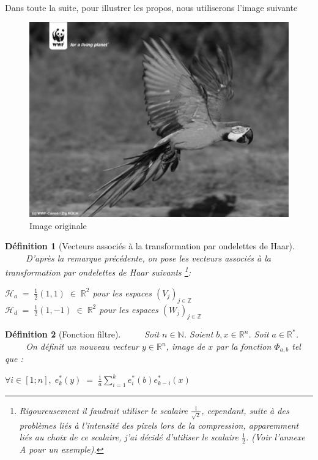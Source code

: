 \documentclass[a4paper,10pt]{report}
\theoremstyle{break}
\newtheorem{Def}{D\'{e}finition}
\begin{document}
    \paragraph{} Dans toute la suite, pour illustrer les propos, nous utiliserons l'image suivante
	\begin{figure}[!h]
	    \centering
	    
	    \includegraphics[width = 0.4 \linewidth]{ara_orig.eps}
	    
	    \caption{Image originale}
	\end{figure}
 
\newpage
	
    \begin{Def}[Vecteurs associ\'{e}s \`{a} la transformation par ondelettes de Haar]
      $\phantom{Prop}$ D'apr\`{e}s la remarque pr\'{e}c\'{e}dente, on pose les vecteurs associ\'{e}s \`{a} la transformation par ondelettes de Haar suivants
      \footnote{Rigoureusement il faudrait utiliser le scalaire $ \frac{1}{\sqrt{2}}$, cependant, suite \`{a} des probl\`{e}mes li\'{e}s
	\`{a} l'intensit\'{e} des pixels lors de la compression, apparemment li\'{e}s au choix de ce scalaire, j'ai d\'{e}cid\'{e}
	d'utiliser le scalaire $\frac{1}{2}$. (Voir l'annexe A pour un exemple).}:
      \begin{center}
	$ \mathcal{H}_a \; = \; \frac{1}{2} (1, 1) \; \in \; \mathbb{R}^2 $ pour les espaces $(V_j)_{j \in \mathbb{Z}}$ \\
	$ \mathcal{H}_d \; = \; \frac{1}{2} (1, -1) \; \in \; \mathbb{R}^2 $ pour les espaces $(W_j)_{j \in \mathbb{Z}}$
      \end{center}
    \end{Def}
	
    \begin{Def}[Fonction filtre]
	$\phantom{Prop}$ Soit $ n \in \mathbb{N} $. Soient $ b, x \in \mathbb{R}^n $. Soit $ a \in \mathbb{R}^* $. \newline
	$\phantom{Prop}$ On d\'{e}finit un nouveau vecteur $ y \in \mathbb{R}^n $, image de $x$ par la fonction $ \Phi_{a,b} $ tel que :
	\begin{center}
	  $ \forall i \in [1;n], \; e_k^* (y) \; = \; \frac{1}{a} \displaystyle\sum_{i = 1}^k e_i^* (b) e_{k - i}^* (x) $
	\end{center}
    \end{Def}
	
\end{document}
